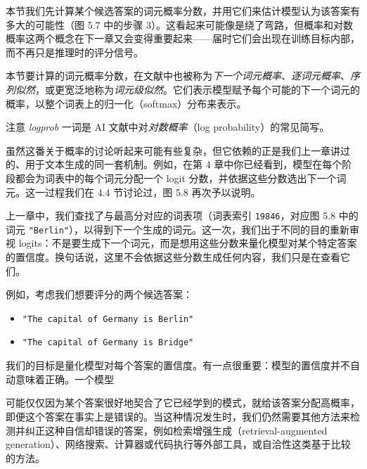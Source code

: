 
本节我们先计算某个候选答案的词元概率分数，并用它们来估计模型认为该答案有多大的可能性（图 5.7 中的步骤 3）。这看起来可能像是绕了弯路，但概率和对数概率这两个概念在下一章又会变得重要起来——届时它们会出现在训练目标内部，而不再只是推理时的评分信号。

本节要计算的词元概率分数，在文献中也被称为\emph{下一个词元概率}、\emph{逐词元概率}、\emph{序列似然}，或更宽泛地称为\emph{词元级似然}。它们表示模型赋予每个可能的下一个词元的概率，以整个词表上的归一化（softmax）分布来表示。

\begin{myWarning}{注意}
 \emph{logprob} 一词是 AI 文献中对\emph{对数概率}（log probability）的常见简写。\end{myWarning}

虽然这番关于概率的讨论听起来可能有些复杂，但它依赖的正是我们上一章讲过的、用于文本生成的同一套机制。例如，在第 4 章中你已经看到，模型在每个阶段都会为词表中的每个词元分配一个 logit 分数，并依据这些分数选出下一个词元。这一过程我们在 4.4 节讨论过，图 5.8 再次予以说明。


上一章中，我们查找了与最高分对应的词表项（词表索引 \texttt{19846}，对应图 5.8 中的词元 \texttt{"}\texttt{Berlin}\texttt{"}），以得到下一个生成的词元。这一次，我们出于不同的目的重新审视 logits：不是要生成下一个词元，而是想用这些分数来量化模型对某个特定答案的置信度。换句话说，这里不会依据这些分数生成任何内容，我们只是在查看它们。

例如，考虑我们想要评分的两个候选答案：

\begin{itemize}
\item \texttt{"}\texttt{The capital of Germany is Berlin}\texttt{"}
\item \texttt{"}\texttt{The capital of Germany is Bridge}\texttt{"}
\end{itemize}

我们的目标是量化模型对每个答案的置信度。有一点很重要：模型的置信度并不自动意味着正确。一个模型

可能仅仅因为某个答案很好地契合了它已经学到的模式，就给该答案分配高概率，即便这个答案在事实上是错误的。当这种情况发生时，我们仍然需要其他方法来检测并纠正这种自信却错误的答案，例如检索增强生成（retrieval-augmented generation）、网络搜索、计算器或代码执行等外部工具，或自洽性这类基于比较的方法。

